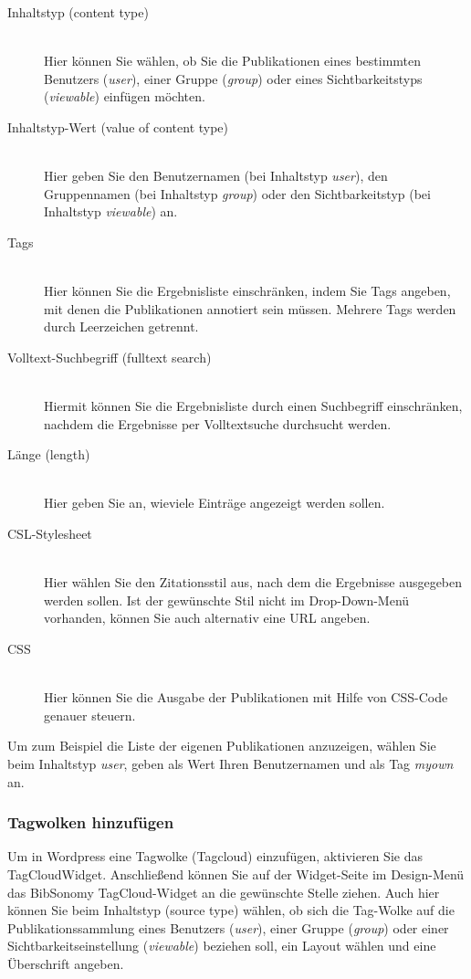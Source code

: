 \begin{description}
\item [Inhaltstyp (content type)] \hfill \\
  Hier können Sie wählen, ob Sie die Publikationen eines bestimmten Benutzers (\textit{user}), einer Gruppe (\textit{group}) oder eines Sichtbarkeitstyps (\textit{viewable}) einfügen möchten.
\item [Inhaltstyp-Wert (value of content type)] \hfill \\
  Hier geben Sie den Benutzernamen (bei Inhaltstyp \textit{user}), den Gruppennamen (bei Inhaltstyp \textit{group}) oder den Sichtbarkeitstyp (bei Inhaltstyp \textit{viewable}) an.
\item [Tags] \hfill \\
  Hier können Sie die Ergebnisliste einschränken, indem Sie Tags angeben, mit denen die Publikationen annotiert sein müssen. Mehrere Tags werden durch Leerzeichen getrennt.
\item [Volltext-Suchbegriff (fulltext search)] \hfill \\
  Hiermit können Sie die Ergebnisliste durch einen Suchbegriff einschränken, nachdem die Ergebnisse per Volltextsuche durchsucht werden.
\item [Länge (length)] \hfill \\
  Hier geben Sie an, wieviele Einträge angezeigt werden sollen.
\item [CSL-Stylesheet] \hfill \\
  Hier wählen Sie den Zitationsstil aus, nach dem die Ergebnisse ausgegeben werden sollen. Ist der gewünschte Stil nicht im Drop-Down-Menü vorhanden, können Sie auch alternativ eine URL angeben.
\item [CSS] \hfill \\
  Hier können Sie die Ausgabe der Publikationen mit Hilfe von CSS-Code genauer steuern.
\end{description}

Um zum Beispiel die Liste der eigenen Publikationen anzuzeigen, wählen Sie beim Inhaltstyp \textit{user}, geben als Wert Ihren Benutzernamen und als Tag \textit{myown} an. 


\subsubsection*{Tagwolken hinzufügen}
\label{sss:wordpressTagcloud}

Um in Wordpress eine Tagwolke (Tagcloud) einzufügen, aktivieren Sie das TagCloudWidget. Anschließend können Sie auf der Widget-Seite im Design-Menü das BibSonomy TagCloud-Widget an die gewünschte Stelle ziehen. Auch hier können Sie beim Inhaltstyp (source type) wählen, ob sich die Tag-Wolke auf die Publikationssammlung eines Benutzers (\textit{user}), einer Gruppe (\textit{group}) oder einer Sichtbarkeitseinstellung (\textit{viewable}) beziehen soll, ein Layout wählen und eine Überschrift angeben.



